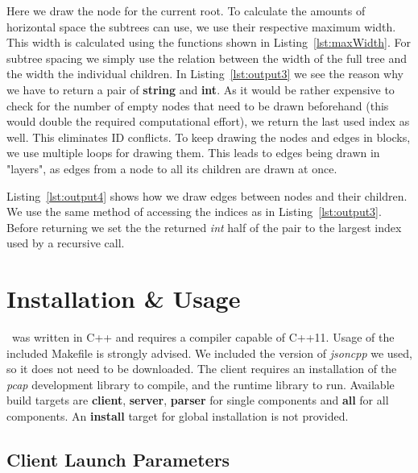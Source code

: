 
Here we draw the node for the current root.
To calculate the amounts of horizontal space the subtrees can use, we use their respective maximum width.
This width is calculated using the functions shown in Listing~\ref{lst:maxWidth}.
For subtree spacing we simply use the relation between the width of the full tree and the width the individual children.
In Listing~\ref{lst:output3} we see the reason why we have to return a pair of \textbf{string} and \textbf{int}.
As it would be rather expensive to check for the number of empty nodes that need to be drawn beforehand (this would double the required computational effort), we return the last used index as well.
This eliminates ID conflicts.
To keep drawing the nodes and edges in blocks, we use multiple loops for drawing them.
This leads to edges being drawn in "layers", as edges from a node to all its children are drawn at once.


Listing~\ref{lst:output4} shows how we draw edges between nodes and their children.
We use the same method of accessing the indices as in Listing~\ref{lst:output3}.
Before returning we set the the returned \textit{int} half of the pair to the largest index used by a recursive call.



\section{Installation \& Usage}
\tool\ was written in C++ and requires a compiler capable of C++11.
Usage of the included Makefile is strongly advised.
We included the version of \textit{jsoncpp} we used, so it does not need to be downloaded.
The client requires an installation of the \textit{pcap} development library to compile, and the runtime library to run.
Available build targets are \textbf{client}, \textbf{server}, \textbf{parser} for single components and \textbf{all} for all components.
An \textbf{install} target for global installation is not provided.
\subsection*{Client Launch Parameters}
